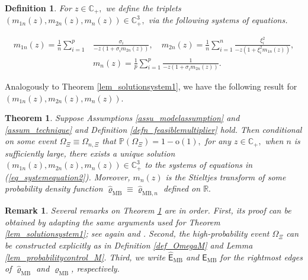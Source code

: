 \documentclass[12pt]{article}
\theoremstyle{plain}
\newtheorem{theorem}{Theorem}[section]
\newtheorem{remark}{Remark}[section]
\newtheorem{definition}{Definition}[section]
\numberwithin{equation}{section}
\begin{document}
\begin{definition}\label{defn_couplesystem} For $z \in \mathbb{C}_+,$  we define the triplets $(m_{1n}(z), m_{2n}(z), m_n(z))\in\mathbb{C}^3_+,$  via the following systems of equations.
	
	\begin{align}\label{eq_systemequation2}
		m_{1n}(z)=\frac{1}{n}\sum_{i=1}^p & \frac{\sigma_i}{-z(1+\sigma_im_{2n}(z))},\quad m_{2n}(z)=\frac{1}{n}\sum_{i=1}^n\frac{\xi_i^2}{-z(1+\xi^2_im_{1n}(z))},\\
		& m_{n}(z)=\frac{1}{p}\sum_{i=1}^p\frac{1}{-z(1+\sigma_im_{2n}(z))}. \nonumber
	\end{align}
\end{definition}
Analogously to Theorem \ref{lem_solutionsystem1}, we have the following result for $(m_{1n}(z),m_{2n}(z),m_n(z))$.
\begin{theorem}\label{lem_solutionsystem2}
	Suppose Assumptions \ref{assu_modelassumption} and \ref{assum_technique} and Definition \ref{defn_feasiblemultiplier} hold. Then conditional on some event $\Omega_{\Xi} \equiv \Omega_{n,\Xi}$ that $\mathbb{P}(\Omega_{\Xi})=1-\mathrm{o}(1),$ for any $z \in \mathbb{C}_+,$ when $n$ is sufficiently large, there exists a unique solution $(m_{1n}(z), m_{2n}(z), m_{n}(z)) \in \mathbb{C}_+^3$ to the systems of equations in  (\ref{eq_systemequation2}). Moreover, $m_n(z)$ is the Stieltjes transform of some probability density function $\widehat{\varrho}_{\mathrm{MB}} \equiv \widehat{\varrho}_{\mathrm{MB},n}$ defined on $\mathbb{R}.$ 
\end{theorem}

\begin{remark}
	Several remarks on Theorem \ref{lem_solutionsystem2} are in order. First, its proof can be obtained by adapting the same arguments used for Theorem \ref{lem_solutionsystem1}; see again \cite[Theorem 2]{Karoui2009} and \cite[Theorem 1]{paul2009no}. Second, the high-probability event $\Omega_{\Xi}$ can be constructed explicitly as in Definition \ref{def_OmegaM} and Lemma \ref{lem_probabilitycontrol_M}. Third, we write $\widehat{\mathsf{E}}_{\mathrm{MB}}$ and $\mathsf{E}_{\mathrm{MB}}$ for the rightmost edges of $\widehat{\varrho}_{\mathrm{MB}}$ and $\varrho_{\mathrm{MB}}$, respectively.
\end{remark}
\end{document}
